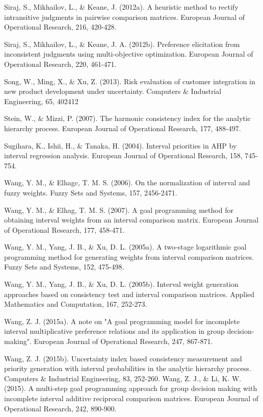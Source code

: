 \documentclass[10pt]{article}
\begin{document}
Siraj, S., Mikhailov, L., \& Keane, J. (2012a). A heuristic method to rectify intransitive judgments in pairwise comparison matrices. European Journal of Operational Research, 216, 420-428.

Siraj, S., Mikhailov, L., \& Keane, J. A. (2012b). Preference elicitation from inconsistent judgments using multi-objective optimization. European Journal of Operational Research, 220, 461-471.

Song, W., Ming, X., \& Xu, Z. (2013). Risk evaluation of customer integration in new product development under uncertainty. Computers \& Industrial Engineering, 65, 402412

Stein, W., \& Mizzi, P. (2007). The harmonic consistency index for the analytic hierarchy process. European Journal of Operational Research, 177, 488-497.

Sugihara, K., Ishii, H., \& Tanaka, H. (2004). Interval priorities in AHP by interval regression analysis. European Journal of Operational Research, 158, 745-754.

Wang, Y. M., \& Elhagc, T. M. S. (2006). On the normalization of interval and fuzzy weights. Fuzzy Sets and Systems, 157, 2456-2471.

Wang, Y. M., \& Elhag, T. M. S. (2007). A goal programming method for obtaining interval weights from an interval comparison matrix. European Journal of Operational Research, 177, 458-471.

Wang, Y. M., Yang, J. B., \& Xu, D. L. (2005a). A two-stage logarithmic goal programming method for generating weights from interval comparison matrices. Fuzzy Sets and Systems, 152, 475-498.

Wang, Y. M., Yang, J. B., \& Xu, D. L. (2005b). Interval weight generation approaches based on consistency test and interval comparison matrices. Applied Mathematics and Computation, 167, 252-273.

Wang, Z. J. (2015a). A note on "A goal programming model for incomplete interval multiplicative preference relations and its application in group decision-making". European Journal of Operational Research, 247, 867-871.

Wang, Z. J. (2015b). Uncertainty index based consistency measurement and priority generation with interval probabilities in the analytic hierarchy process. Computers \& Industrial Engineering, 83, 252-260.
Wang, Z. J., \& Li, K. W. (2015). A multi-step goal programming approach for group decision making with incomplete interval additive reciprocal comparison matrices. European Journal of Operational Research, 242, 890-900.
\end{document}
